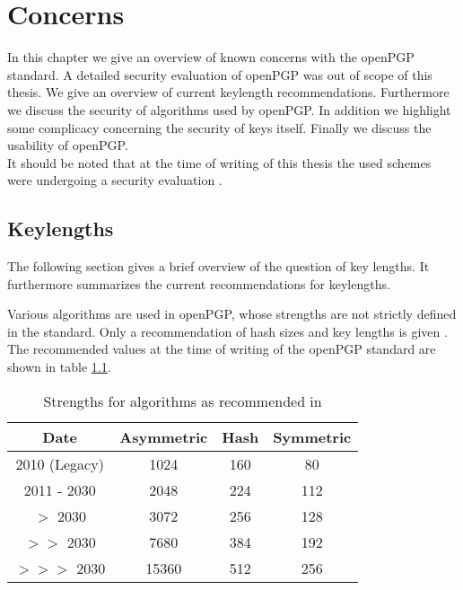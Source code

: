 \chapter{Concerns} \label{chapter:concerns}


In this chapter we give an overview of known concerns with the openPGP standard. A detailed security evaluation of openPGP was out of scope of this thesis. We give an overview of current keylength recommendations. Furthermore we discuss the security of algorithms used by openPGP. In addition we highlight some complicacy concerning the security of keys itself. Finally we discuss the usability of openPGP. \\

It should be noted that at the time of writing of this thesis the used schemes were undergoing a security evaluation \citep{TUB2015}.



\section{Keylengths}

The following section gives a brief overview of the question of key lengths. It furthermore summarizes the current recommendations for keylengths. 

Various algorithms are used in openPGP, whose strengths are not strictly defined in the standard. 
Only a recommendation of hash sizes and key lengths is given \citep[section 14]{RFC4880}.
The recommended values at the time of writing of the openPGP standard are shown in table \ref{tab:keylengths}.

\begin{table}[h]
	\centering
	\begin{tabular}{|c|c|c|c|}
		\hline Date & 			Asymmetric & Hash & Symmetric \\ 
		\hline\hline 2010 (Legacy) & 1024 & 160 & 80 \\ 
		\hline 2011 - 2030 & 2048 & 224 & 112 \\ 
		\hline $>$ 2030 		   & 3072 & 256 & 128 \\ 
		\hline $>>$ 2030       & 7680 & 384 & 192 \\ 
		\hline $>>>$ 2030     & 15360 & 512 & 256 \\ 
		\hline 
	\end{tabular}
	\label{tab:keylengths}
	\caption{Strengths for algorithms as recommended in \citep[section 14]{RFC4880}} 
\end{table}

